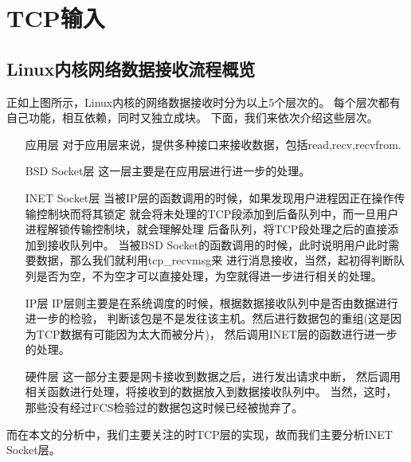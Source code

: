 \chapter{TCP输入}
\label{chapter:tcp_input}
	\section{Linux内核网络数据接收流程概览}
		正如上图所示，Linux内核的网络数据接收时分为以上5个层次的。
		每个层次都有自己功能，相互依赖，同时又独立成块。
		下面，我们来依次介绍这些层次。
\begin{enumerate}
\item[应用层]			对于应用层来说，提供多种接口来接收数据，包括read,recv,recvfrom.
\item[BSD Socket层]		这一层主要是在应用层进行进一步的处理。
\item[INET Socket层]		当被IP层的函数调用的时候，如果发现用户进程因正在操作传输控制块而将其锁定
						就会将未处理的TCP段添加到后备队列中，而一旦用户进程解锁传输控制块，就会理解处理
						后备队列，将TCP段处理之后的直接添加到接收队列中。
						当被BSD Socket的函数调用的时候，此时说明用户此时需要数据，那么我们就利用tcp\_recvmsg来
						进行消息接收，当然，起初得判断队列是否为空，不为空才可以直接处理，为空就得进一步进行相关的处理。
\item[IP层]
				IP层则主要是在系统调度的时候，根据数据接收队列中是否由数据进行进一步的检验，
				判断该包是不是发往该主机。然后进行数据包的重组(这是因为TCP数据有可能因为太大而被分片)，
				然后调用INET层的函数进行进一步的处理。
\item[硬件层]     这一部分主要是网卡接收到数据之后，进行发出请求中断，
				  然后调用相关函数进行处理，将接收到的数据放入到数据接收队列中。
					当然，这时，那些没有经过FCS检验过的数据包这时候已经被抛弃了。
\end{enumerate}

		而在本文的分析中，我们主要关注的时TCP层的实现，故而我们主要分析INET Socket层。
